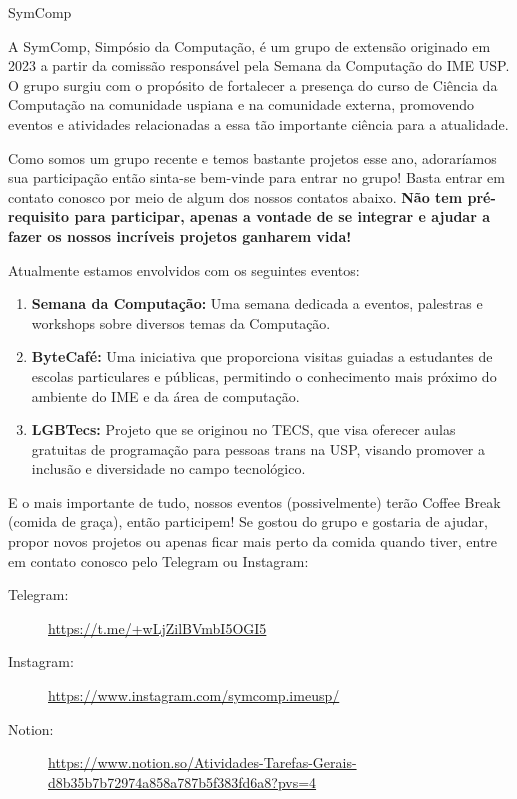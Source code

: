 \begin{subsecao}{SymComp}


A SymComp, Simpósio da Computação, é um grupo de extensão originado em 2023 a 
partir da comissão responsável pela Semana da Computação do IME USP. O grupo surgiu
com o propósito de fortalecer a presença do curso de Ciência da Computação na 
comunidade uspiana e na comunidade externa, promovendo eventos e atividades 
relacionadas a essa tão importante ciência para a atualidade.

Como somos um grupo recente e temos bastante projetos esse ano, adoraríamos sua 
participação então sinta-se bem-vinde para entrar no grupo! Basta entrar em contato
conosco por meio de algum dos nossos contatos abaixo. \textbf{Não tem pré-requisito 
para participar, apenas a vontade de se integrar e ajudar a fazer os nossos 
incríveis projetos ganharem vida!} 

Atualmente estamos envolvidos com os seguintes eventos:

\begin{enumerate}
\item \textbf{Semana da Computação:} Uma semana dedicada a eventos, palestras e 
 workshops sobre diversos temas da Computação.
\item \textbf{ByteCafé:} Uma iniciativa que proporciona visitas guiadas a 
 estudantes de escolas particulares e públicas, permitindo o conhecimento mais 
 próximo do ambiente do IME e da área de computação.
\item \textbf{LGBTecs:} Projeto que se originou no TECS, que visa oferecer aulas 
 gratuitas de programação para pessoas trans na USP, visando promover a inclusão e 
 diversidade no campo tecnológico.
\end{enumerate}

E o mais importante de tudo, nossos eventos (possivelmente) terão Coffee Break 
(comida de graça), então participem! Se gostou do grupo e gostaria de ajudar, 
propor novos projetos ou apenas ficar mais perto da comida quando tiver, entre em 
contato conosco pelo Telegram ou Instagram:

\begin{description}
  \item[Telegram:] \url{https://t.me/+wLjZilBVmbI5OGI5}
  \item[Instagram:] \url{https://www.instagram.com/symcomp.imeusp/}
  \item[Notion:] \url{https://www.notion.so/Atividades-Tarefas-Gerais-d8b35b7b72974a858a787b5f383fd6a8?pvs=4}
\end{description}


\end{subsecao}
